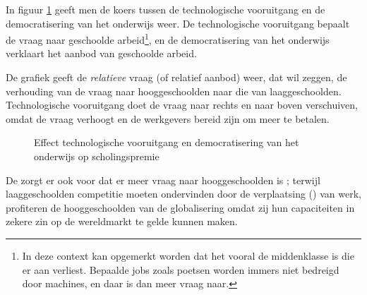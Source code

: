 \par In figuur \ref{fig:h6schoolarbeid} geeft men de koers tussen de technologische vooruitgang en de democratisering van het onderwijs weer. De technologische vooruitgang bepaalt de vraag naar geschoolde arbeid\footnote{In deze context kan opgemerkt worden dat het vooral de middenklasse is die er aan verliest. Bepaalde jobs zoals poetsen worden immers niet bedreigd door machines, en daar is dan meer vraag naar.}, en de democratisering van het onderwijs verklaart het aanbod van geschoolde arbeid.
\par De grafiek geeft de \textit{relatieve} vraag (of relatief aanbod) weer, dat wil zeggen, de verhouding van de vraag naar hooggeschoolden naar die van laaggeschoolden. Technologische vooruitgang doet de vraag naar rechts en naar boven verschuiven, omdat de vraag verhoogt en de werkgevers bereid zijn om meer te betalen.

\begin{figure}[H]
\vspace{0.5cm}
\centering\small
\captionsetup{justification=centering,margin=2cm}
\caption{Effect technologische vooruitgang en democratisering van het onderwijs op scholingspremie}
\label{fig:h6schoolarbeid}
\end{figure}

\noindent De  zorgt er ook voor dat er meer vraag naar hooggeschoolden is ; terwijl laaggeschoolden competitie moeten ondervinden door de verplaatsing () van werk, profiteren de hooggeschoolden van de globalisering omdat zij hun capaciteiten in zekere zin op de wereldmarkt te gelde kunnen maken.\\

